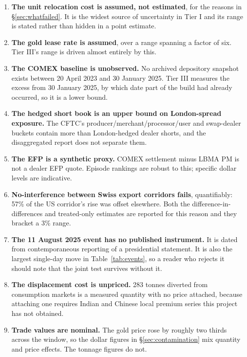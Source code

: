 \documentclass[11pt,a4paper]{article}
\begin{document}
\begin{enumerate}[leftmargin=*]
\item \textbf{The unit relocation cost is assumed, not estimated}, for the reasons in
\S\ref{sec:whatfailed}. It is the widest source of uncertainty in Tier I and its range is stated
rather than hidden in a point estimate.

\item \textbf{The gold lease rate is assumed}, over a range spanning a factor of six. Tier III's
range is driven almost entirely by this.

\item \textbf{The COMEX baseline is unobserved.} No archived depository snapshot exists between
20 April 2023 and 30 January 2025. Tier III measures the excess from 30 January 2025, by which
date part of the build had already occurred, so it is a lower bound.

\item \textbf{The hedged short book is an upper bound on London-spread exposure.} The CFTC's
producer/merchant/processor/user and swap-dealer buckets contain more than London-hedged dealer
shorts, and the disaggregated report does not separate them.

\item \textbf{The EFP is a synthetic proxy.} COMEX settlement minus LBMA PM is not a dealer EFP
quote. Episode rankings are robust to this; specific dollar levels are indicative.

\item \textbf{No-interference between Swiss export corridors fails}, quantifiably: 57\% of the
US corridor's rise was offset elsewhere. Both the difference-in-differences and treated-only
estimates are reported for this reason and they bracket a 3\% range.

\item \textbf{The 11 August 2025 event has no published instrument.} It is dated from
contemporaneous reporting of a presidential statement. It is also the largest single-day move in
Table~\ref{tab:events}, so a reader who rejects it should note that the joint test survives
without it.

\item \textbf{The displacement cost is unpriced.} 283 tonnes diverted from consumption markets
is a measured quantity with no price attached, because attaching one requires Indian and Chinese
local premium series this project has not obtained.

\item \textbf{Trade values are nominal.} The gold price rose by roughly two thirds across the
window, so the dollar figures in \S\ref{sec:contamination} mix quantity and price effects. The
tonnage figures do not.
\end{enumerate}
\end{document}
